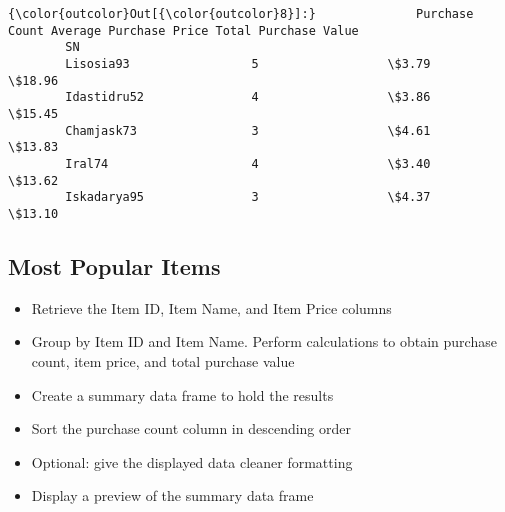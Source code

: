 \documentclass[11pt]{article}
\begin{document}
\begin{Verbatim}[commandchars=\\\{\}]
{\color{outcolor}Out[{\color{outcolor}8}]:}              Purchase Count Average Purchase Price Total Purchase Value
        SN                                                                     
        Lisosia93                 5                  \$3.79               \$18.96
        Idastidru52               4                  \$3.86               \$15.45
        Chamjask73                3                  \$4.61               \$13.83
        Iral74                    4                  \$3.40               \$13.62
        Iskadarya95               3                  \$4.37               \$13.10
\end{Verbatim}
            
    \subsection{Most Popular Items}\label{most-popular-items}

    \begin{itemize}
\item
  Retrieve the Item ID, Item Name, and Item Price columns
\item
  Group by Item ID and Item Name. Perform calculations to obtain
  purchase count, item price, and total purchase value
\item
  Create a summary data frame to hold the results
\item
  Sort the purchase count column in descending order
\item
  Optional: give the displayed data cleaner formatting
\item
  Display a preview of the summary data frame
\end{itemize}
\end{document}
